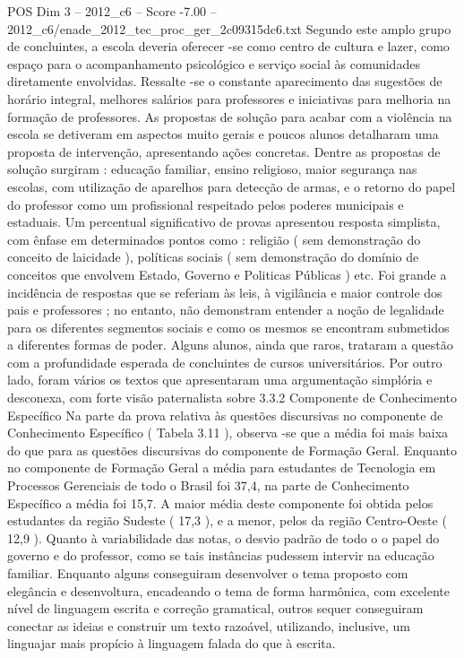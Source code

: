 \begin{textsample}{POS Dim 3 – 2012\_c6 – Score -7.00 – 2012\_c6/enade\_2012\_tec\_proc\_ger\_2c09315dc6.txt}
Segundo este amplo grupo de concluintes, a escola deveria oferecer -se como centro de cultura e lazer, como espaço para o acompanhamento psicológico e serviço social às comunidades diretamente envolvidas.
Ressalte -se o constante aparecimento das sugestões de horário integral, melhores salários para professores e iniciativas para melhoria na formação de professores.
As propostas de solução para acabar com a violência na escola se detiveram em aspectos muito gerais e poucos alunos detalharam uma proposta de intervenção, apresentando ações concretas.
Dentre as propostas de solução surgiram : educação familiar, ensino religioso, maior segurança nas escolas, com utilização de aparelhos para detecção de armas, e o retorno do papel do professor como um profissional respeitado pelos poderes municipais e estaduais.
Um percentual significativo de provas apresentou resposta simplista, com ênfase em determinados pontos como : religião ( sem demonstração do conceito de laicidade ), políticas sociais ( sem demonstração do domínio de conceitos que envolvem Estado, Governo e Politicas Públicas ) etc.
Foi grande a incidência de respostas que se referiam às leis, à vigilância e maior controle dos pais e professores ; no entanto, não demonstram entender a noção de legalidade para os diferentes segmentos sociais e como os mesmos se encontram submetidos a diferentes formas de poder.
Alguns alunos, ainda que raros, trataram a questão com a profundidade esperada de concluintes de cursos universitários.
Por outro lado, foram vários os textos que apresentaram uma argumentação simplória e desconexa, com forte visão paternalista sobre 3.3.2 Componente de Conhecimento Específico Na parte da prova relativa às questões discursivas no componente de Conhecimento Específico ( Tabela 3.11 ), observa -se que a média foi mais baixa do que para as questões discursivas do componente de Formação Geral.
Enquanto no componente de Formação Geral a média para estudantes de Tecnologia em Processos Gerenciais de todo o Brasil foi 37,4, na parte de Conhecimento Específico a média foi 15,7.
A maior média deste componente foi obtida pelos estudantes da região Sudeste ( 17,3 ), e a menor, pelos da região Centro-Oeste ( 12,9 ).
Quanto à variabilidade das notas, o desvio padrão de todo o o papel do governo e do professor, como se tais instâncias pudessem intervir na educação familiar.
Enquanto alguns conseguiram desenvolver o tema proposto com elegância e desenvoltura, encadeando o tema de forma harmônica, com excelente nível de linguagem escrita e correção gramatical, outros sequer conseguiram conectar as ideias e construir um texto razoável, utilizando, inclusive, um linguajar mais propício à linguagem falada do que à escrita.

\end{textsample}
